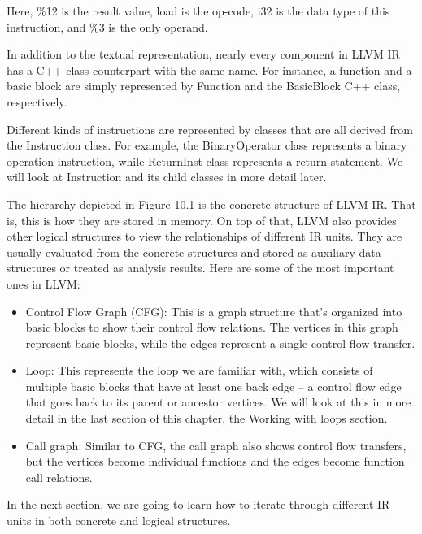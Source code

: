 Here, \%12 is the result value, load is the op-code, i32 is the data type of this instruction, and \%3 is the only operand.

In addition to the textual representation, nearly every component in LLVM IR has a C++ class counterpart with the same name. For instance, a function and a basic block are simply represented by Function and the BasicBlock C++ class, respectively.

Different kinds of instructions are represented by classes that are all derived from the Instruction class. For example, the BinaryOperator class represents a binary operation instruction, while ReturnInst class represents a return statement. We will look at Instruction and its child classes in more detail later.

The hierarchy depicted in Figure 10.1 is the concrete structure of LLVM IR. That is, this is how they are stored in memory. On top of that, LLVM also provides other logical structures to view the relationships of different IR units. They are usually evaluated from the concrete structures and stored as auxiliary data structures or treated as analysis results. Here are some of the most important ones in LLVM:

\begin{itemize}
\item Control Flow Graph (CFG): This is a graph structure that's organized into basic blocks to show their control flow relations. The vertices in this graph represent basic blocks, while the edges represent a single control flow transfer.

\item Loop: This represents the loop we are familiar with, which consists of multiple basic blocks that have at least one back edge – a control flow edge that goes back to its parent or ancestor vertices. We will look at this in more detail in the last section of this chapter, the Working with loops section.

\item Call graph: Similar to CFG, the call graph also shows control flow transfers, but the vertices become individual functions and the edges become function call relations.
\end{itemize}

In the next section, we are going to learn how to iterate through different IR units in both concrete and logical structures.


